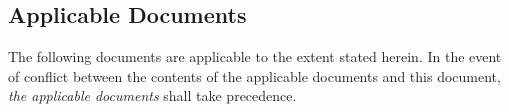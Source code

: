 \documentclass[11pt,a4paper,variablewidth]{article}
\begin{document}

\newcommand{\Wim}{{{\W^{\rm im}}}}
\newcommand{\Wimd}{{{{\W^{\rm im}}^\dag}}}
\newcommand{\Wnt}{{{\W^{\rm {mfs}}_t}}}
\newcommand{\Wntd}{{{{\W^{\rm {mfs}}_t}^\dag}}}
\newcommand{\Wnp}{{{\W^{\rm mfs}_p}}}
\newcommand{\Wnpd}{{{{\W^{\rm mfs}_p}^\dag}}}
\newcommand{\Wnq}{{{\W^{\rm mfs}_q}}}
\newcommand{\Wnqd}{{{{\W^{\rm {mfs}}_q}^\dag}}}
\newcommand{\Wimn}{{{\W^{\rm im}_{\nu}}}}
\newcommand{\Wimnd}{{{{\W^{\rm im}_{\nu}}^\dag}}}

\newcommand{\wnt}{{w_{\nu}^t}}
\newcommand{\wnq}{{w_{\nu}^q}}
\newcommand{\wntq}{{w_{\nu}^{t+q}}}

\newcommand{\pd}{{\partial}}
\newcommand{\mi}{{m_{I}}}
\newcommand{\R}{{R}}
\newcommand{\Rd}{{R^\dag}}
\newcommand{\I}{{\vec{I}}}

\newcommand{\Nt}{N_{\rm t}}
\newcommand{\Ns}{N_{\rm s}}
\newcommand{\Nc}{N_{\rm c}}


\sdplistoffigures

\sdplistoftables

\sdpsummary


\newpage

\sdpreferencedocs

\subsection*{Applicable Documents}

The following documents are applicable to the extent stated herein. In the
event of conflict between the contents of the applicable documents and this
document, \emph{the applicable documents} shall take precedence.
\end{document}

